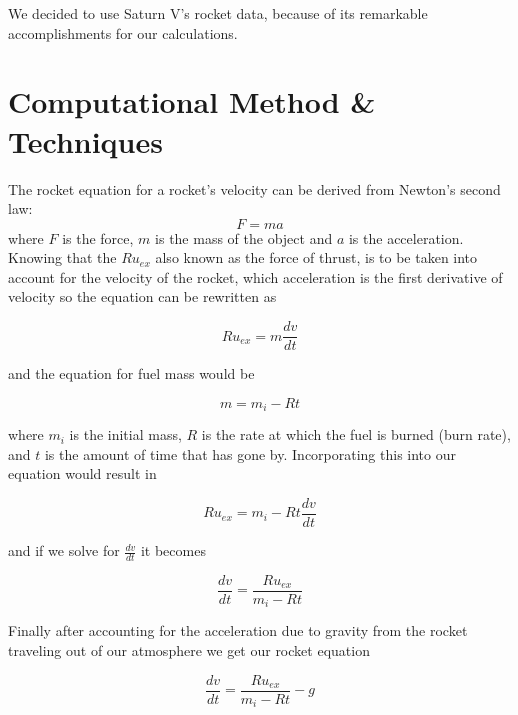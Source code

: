 \documentclass[11pt]{article}
\begin{document}
\vspace{.25cm}

We decided to use Saturn V's rocket data, because of its remarkable accomplishments for our calculations.


\section{Computational Method \& Techniques}
The rocket equation for a rocket's velocity can be derived from Newton's second law:
\begin{equation}
F = ma
\end{equation}
where $F$ is the force, $m$ is the mass of the object and $a$ is the acceleration. Knowing that the $Ru_{ex}$ also known as the force of thrust, is to be taken into account for the velocity of the rocket, which acceleration is the first derivative of velocity so the equation can be rewritten as

\begin{equation}
Ru_{ex} = m \frac{dv}{dt}
\end{equation}

\noindent and the equation for fuel mass would be 

\begin{equation}
m = m_i - Rt
\end{equation}

\noindent where $m_i$ is the initial mass, $R$ is the rate at which the fuel is burned (burn rate), and $t$ is the amount of time that has gone by. Incorporating this into our equation would result in

\begin{equation}
Ru_{ex} = m_i - Rt \frac{dv}{dt}
\end{equation}

\noindent and if we solve for $\frac{dv}{dt}$ it becomes

\begin{equation}
\frac{dv}{dt} = \frac{Ru_{ex}}{m_i - Rt}
\end{equation} 

Finally after accounting for the acceleration due to gravity from the rocket traveling out of our atmosphere we get our rocket equation

\begin{equation}\label{eq:rocketeq}
\frac{dv}{dt} = \frac{Ru_{ex}}{m_i-Rt}-g
\end{equation}
\end{document}
